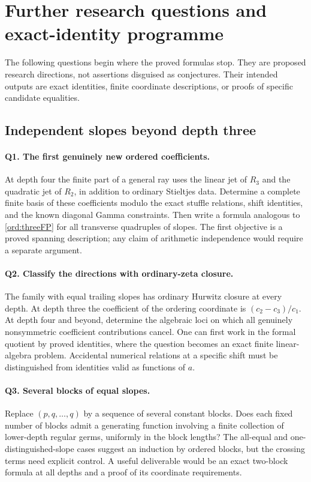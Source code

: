 \section{Further research questions and exact-identity programme}
\label{sec:questions}

The following questions begin where the proved formulas stop. They
are proposed research directions, not assertions disguised as
conjectures. Their intended outputs are exact identities, finite
coordinate descriptions, or proofs of specific candidate equalities.

\subsection{Independent slopes beyond depth three}

\paragraph{Q1. The first genuinely new ordered coefficients.}
At depth four the finite part of a general ray uses the linear jet
of $R_3$ and the quadratic jet of $R_2$, in addition to ordinary
Stieltjes data. Determine a complete finite basis of these
coefficients modulo the exact stuffle relations, shift identities,
and the known diagonal Gamma constraints. Then write a formula
analogous to \eqref{ord:threeFP} for all transverse quadruples of
slopes. The first objective is a proved spanning description; any
claim of arithmetic independence would require a separate argument.

\paragraph{Q2. Classify the directions with ordinary-zeta closure.}
The family with equal trailing slopes has ordinary Hurwitz closure
at every depth. At depth three the coefficient of the ordering
coordinate is $(c_2-c_3)/c_1$. At depth four and beyond, determine
the algebraic loci on which all genuinely nonsymmetric coefficient
contributions cancel. One can first work in the formal quotient by
proved identities, where the question becomes an exact finite
linear-algebra problem. Accidental numerical relations at a specific
shift must be distinguished from identities valid as functions of $a$.

\paragraph{Q3. Several blocks of equal slopes.}
Replace $(p,q,\ldots,q)$ by a sequence of several constant blocks.
Does each fixed number of blocks admit a generating function involving
a finite collection of lower-depth regular germs, uniformly in the
block lengths? The all-equal and one-distinguished-slope cases suggest
an induction by ordered blocks, but the crossing terms need explicit
control. A useful deliverable would be an exact two-block formula at
all depths and a proof of its coordinate requirements.

